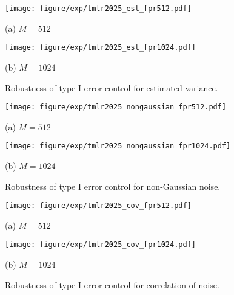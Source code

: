 \begin{figure}[H]
  \centering
  \begin{minipage}[t]{0.45\hsize}
      \centering
      \texttt{[image: figure/exp/tmlr2025\_est\_fpr512.pdf]}
      \caption*{(a) $M=512$}
  \end{minipage}
  \hfill
  \begin{minipage}[t]{0.45\hsize}
      \centering
      \texttt{[image: figure/exp/tmlr2025\_est\_fpr1024.pdf]}
      \caption*{(b) $M=1024$}
  \end{minipage}
  \caption{Robustness of type I error control for estimated variance.}
  \label{fig_fpr_est}
\end{figure}

\begin{figure}[H]
  \centering
  \begin{minipage}[t]{0.45\hsize}
      \centering
      \texttt{[image: figure/exp/tmlr2025\_nongaussian\_fpr512.pdf]}
      \caption*{(a) $M=512$}
  \end{minipage}
  \hfill
  \begin{minipage}[t]{0.45\hsize}
      \centering
      \texttt{[image: figure/exp/tmlr2025\_nongaussian\_fpr1024.pdf]}
      \caption*{(b) $M=1024$}
  \end{minipage}
  \caption{Robustness of type I error control for non-Gaussian noise.}
  \label{fig_fpr_nongaussian}
\end{figure}

\begin{figure}[H]
  \centering
  \begin{minipage}[t]{0.45\hsize}
      \centering
      \texttt{[image: figure/exp/tmlr2025\_cov\_fpr512.pdf]}
      \caption*{(a) $M=512$}
  \end{minipage}
  \hfill
  \begin{minipage}[t]{0.45\hsize}
      \centering
      \texttt{[image: figure/exp/tmlr2025\_cov\_fpr1024.pdf]}
      \caption*{(b) $M=1024$}
  \end{minipage}
  \caption{Robustness of type I error control for correlation of noise.}
  \label{fig_fpr_cov}
\end{figure}

